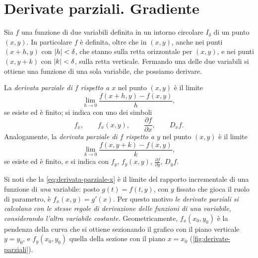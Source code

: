 \section{Derivate parziali. Gradiente}
\label{sec:derivate-parziali}

Sia $f$ una funzione di due variabili definita in un intorno circolare $I_{\delta}$ di un
punto $(x,y)$. In particolare $f$ è definita, oltre che in $(x,y)$, anche nei punti
$(x+h,y)$ con $\lvert h\rvert<\delta$, che stanno sulla retta orizzontale per $(x,y)$, e nei punti
$(x,y+k)$ con $\lvert k\rvert<\delta$, sulla retta verticale. Fermando una delle due variabili si
ottiene una funzione di una sola variabile, che possiamo derivare.

\begin{definizione}\label{def:derivate-parziali}
La \emph{derivata parziale di $f$ rispetto a $x$} nel punto $(x,y)$ è il limite
\begin{equation}\label{eq:derivata-parziale-x}
  \lim_{h\to0}\frac{f(x+h,y)-f(x,y)}{h},
\end{equation}
se esiste ed è finito; si indica con uno dei simboli
\begin{equation}\label{eq:notazioni-parziale-x}
  f_{x}, \qquad f_{x}(x,y), \qquad \frac{\partial f}{\partial x}, \qquad D_{x}f .
\end{equation}
Analogamente, la \emph{derivata parziale di $f$ rispetto a $y$} nel punto $(x,y)$ è il
limite
\begin{equation}\label{eq:derivata-parziale-y}
  \lim_{k\to0}\frac{f(x,y+k)-f(x,y)}{k},
\end{equation}
se esiste ed è finito, e si indica con $f_{y}$, $f_{y}(x,y)$, $\frac{\partial f}{\partial y}$,
$D_{y}f$.
\end{definizione}

Si noti che la \eqref{eq:derivata-parziale-x} è il limite del rapporto incrementale di una
funzione di \emph{una} variabile: posto $g(t)=f(t,y)$, con $y$ fissato che gioca il ruolo
di parametro, è $f_{x}(x,y)=g'(x)$. Per questo motivo \emph{le derivate parziali si
calcolano con le stesse regole di derivazione delle funzioni di una variabile,
considerando l'altra variabile costante}. Geometricamente, $f_{x}(x_{0},y_{0})$ è la
pendenza della curva che si ottiene sezionando il grafico con il piano verticale
$y=y_{0}$, e $f_{y}(x_{0},y_{0})$ quella della sezione con il piano $x=x_{0}$
(\cref{fig:derivate-parziali}).

